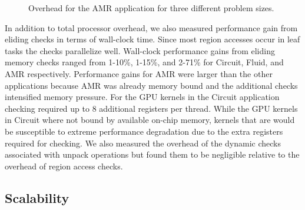 \begin{figure}
\begin{center}
{\label{fig:amr16384}
}
\end{center}
\vspace{-2mm}
\caption{Overhead for the AMR application for three different problem sizes.\label{fig:amr_overhead}}
\vspace{-6mm}
\end{figure}

In addition to total processor overhead, we also measured performance gain from eliding checks in 
terms of wall-clock time.  Since most region accesses occur in leaf tasks the checks parallelize 
well.  Wall-clock performance gains from eliding memory checks ranged from 1-10\%, 1-15\%, 
and 2-71\% for Circuit, Fluid, and AMR respectively.  Performance gains for AMR were larger than
the other applications because AMR was already memory bound and the additional checks intensified
memory pressure.  For the GPU kernels in the Circuit application checking required up to 8 additional 
registers per thread.  While the GPU kernels in Circuit where not bound by 
available on-chip memory, kernels that are would be susceptible to extreme performance 
degradation due to the extra registers required for checking.  We also measured the overhead
of the dynamic checks associated with unpack operations but found them to be negligible relative
to the overhead of region access checks.

\subsection{Scalability}
\label{subsec:scalability}


